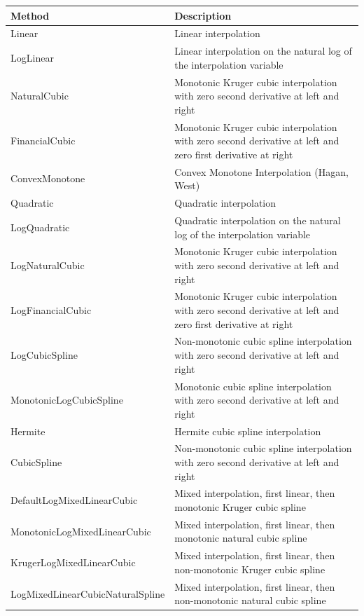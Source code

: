 \begin{table}[H]
\centering
\begin{tabular}{|l|p{9cm}|}
    \hline
    {\bfseries Method} & {\bfseries Description} \\
    \hline
    Linear & Linear interpolation \\ \hline
    LogLinear & Linear interpolation on the natural log of the interpolation variable \\ \hline
    NaturalCubic & Monotonic Kruger cubic interpolation with zero second derivative at left and right \\ \hline
    FinancialCubic & Monotonic Kruger cubic interpolation with zero second derivative at left and
                     zero first derivative at right \\ \hline
    ConvexMonotone & Convex Monotone Interpolation (Hagan, West) \\ \hline
    Quadratic & Quadratic interpolation \\ \hline
    LogQuadratic & Quadratic interpolation on the natural log of the interpolation variable \\ \hline
    LogNaturalCubic & Monotonic Kruger cubic interpolation with zero second derivative at left and right \\ \hline
    LogFinancialCubic & Monotonic Kruger cubic interpolation with zero second derivative at left and
                     zero first derivative at right \\ \hline
    LogCubicSpline & Non-monotonic cubic spline interpolation with zero second derivative at left and right \\ \hline
    MonotonicLogCubicSpline & Monotonic cubic spline interpolation with zero second derivative at left and right \\ \hline
    Hermite & Hermite cubic spline interpolation \\ \hline
    CubicSpline & Non-monotonic cubic spline interpolation with zero second derivative at left and right \\ \hline
    DefaultLogMixedLinearCubic & Mixed interpolation, first linear, then monotonic Kruger cubic spline \\ \hline
    MonotonicLogMixedLinearCubic & Mixed interpolation, first linear, then monotonic natural cubic spline \\ \hline
    KrugerLogMixedLinearCubic & Mixed interpolation, first linear, then non-monotonic Kruger cubic spline \\ \hline
    LogMixedLinearCubicNaturalSpline & Mixed interpolation, first linear, then non-monotonic natural cubic spline \\ \hline

\end{tabular}
\end{table}
